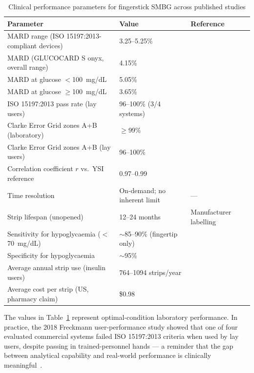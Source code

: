 \begin{table}[H]
\centering
\caption{Clinical performance parameters for fingerstick SMBG across published studies}
\label{tab:fingerstick_stats}
\begin{tabular}{p{7cm}p{4cm}p{3cm}}
\toprule
\textbf{Parameter} & \textbf{Value} & \textbf{Reference} \\
\midrule
MARD range (ISO 15197:2013-compliant devices) & 3.25--5.25\% & \cite{freckmann2022mard} \\
MARD (GLUCOCARD S onyx, overall range) & 4.15\% & \cite{glucocard2025} \\
MARD at glucose $<$100~mg/dL & 5.05\% & \cite{glucocard2025} \\
MARD at glucose $\geq$100~mg/dL & 3.65\% & \cite{glucocard2025} \\
ISO 15197:2013 pass rate (lay users) & 96--100\% (3/4 systems) & \cite{freckmann2018user} \\
Clarke Error Grid zones A+B (laboratory) & $\geq$99\% & \cite{gluconavii2022} \\
Clarke Error Grid zones A+B (lay users) & 96--100\% & \cite{freckmann2018user} \\
Correlation coefficient $r$ vs.\ YSI reference & 0.97--0.99 & \cite{macleod2019} \\
Time resolution & On-demand; no inherent limit & --- \\
Strip lifespan (unopened) & 12--24 months & Manufacturer labelling \\
Sensitivity for hypoglycaemia ($<$70~mg/dL) & $\sim$85--90\% (fingertip only) & \cite{bina2003} \\
Specificity for hypoglycaemia & $\sim$95\% & \cite{bina2003} \\
Average annual strip use (insulin users) & 764--1094 strips/year & \cite{yeaw2012,yeawcanada2012} \\
Average cost per strip (US, pharmacy claim) & \$0.98 & \cite{yeaw2012} \\
\bottomrule
\end{tabular}
\end{table}

The values in Table~\ref{tab:fingerstick_stats} represent optimal-condition laboratory performance. In practice, the 2018 Freckmann user-performance study showed that one of four evaluated commercial systems failed ISO 15197:2013 criteria when used by lay users, despite passing in trained-personnel hands --- a reminder that the gap between analytical capability and real-world performance is clinically meaningful~\cite{freckmann2018user}.

